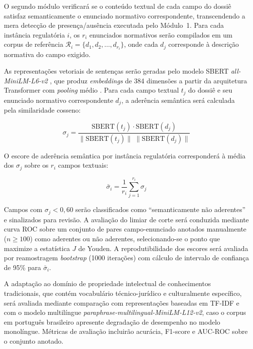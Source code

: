 O segundo módulo verificará se o conteúdo textual de cada campo do dossiê satisfaz semanticamente o enunciado normativo correspondente, transcendendo a mera detecção de presença/ausência executada pelo Módulo~1. Para cada instância regulatória $i$, os $r_i$ enunciados normativos serão compilados em um corpus de referência $\mathcal{R}_i = \{d_1, d_2, \ldots, d_{r_i}\}$, onde cada $d_j$ corresponde à descrição normativa do campo exigido.

As representações vetoriais de sentenças serão geradas pelo modelo SBERT \textit{all-MiniLM-L6-v2} \cite{Reimers2019}, que produz \textit{embeddings} de 384 dimensões a partir da arquitetura Transformer com \textit{pooling} médio \cite{Devlin2019}. Para cada campo textual $t_j$ do dossiê e seu enunciado normativo correspondente $d_j$, a aderência semântica será calculada pela similaridade cosseno:

\begin{equation}
\sigma_j = \frac{\text{SBERT}(t_j) \cdot \text{SBERT}(d_j)}{\|\text{SBERT}(t_j)\| \; \|\text{SBERT}(d_j)\|}
\label{eq:cosseno_cap5}
\end{equation}

O escore de aderência semântica por instância regulatória corresponderá à média dos $\sigma_j$ sobre os $r_i$ campos textuais:

\begin{equation}
\bar{\sigma}_i = \frac{1}{r_i} \sum_{j=1}^{r_i} \sigma_j
\label{eq:sigma_mean_cap5}
\end{equation}

Campos com $\sigma_j < 0{,}60$ serão classificados como ``semanticamente não aderentes'' e sinalizados para revisão. A avaliação do limiar de corte será conduzida mediante curva ROC sobre um conjunto de pares campo-enunciado anotados manualmente ($n \geq 100$) como aderentes ou não aderentes, selecionando-se o ponto que maximize a estatística $J$ de Youden. A reprodutibilidade dos escores será avaliada por reamostragem \textit{bootstrap} (1000 iterações) com cálculo de intervalo de confiança de 95\% para $\bar{\sigma}_i$.

A adaptação ao domínio de propriedade intelectual de conhecimentos tradicionais, que contém vocabulário técnico-jurídico e culturalmente específico, será avaliada mediante comparação com representações baseadas em TF-IDF e com o modelo multilíngue \textit{paraphrase-multilingual-MiniLM-L12-v2}, caso o corpus em português brasileiro apresente degradação de desempenho no modelo monolíngue. Métricas de avaliação incluirão acurácia, F1-score e AUC-ROC sobre o conjunto anotado.

